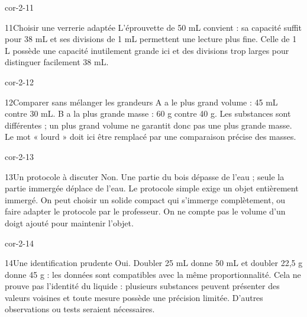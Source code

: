 \documentclass[12pt,twoside,openany]{book}
\begin{document}
\begin{blocLivre}{cor-2-11}
\begin{corrige}{11}{Choisir une verrerie adaptée}
L’éprouvette de 50 mL convient : sa capacité suffit pour 38 mL et ses divisions de 1 mL permettent une lecture plus fine. Celle de 1 L possède une capacité inutilement grande ici et des divisions trop larges pour distinguer facilement 38 mL.\par
\end{corrige}\end{blocLivre}
\clearpage
\begin{blocLivre}{cor-2-12}
\begin{corrige}{12}{Comparer sans mélanger les grandeurs}
A a le plus grand volume : 45 mL contre 30 mL. B a la plus grande masse : 60 g contre 40 g. Les substances sont différentes ; un plus grand volume ne garantit donc pas une plus grande masse. Le mot « lourd » doit ici être remplacé par une comparaison précise des masses.\par
\end{corrige}\end{blocLivre}
\begin{blocLivre}{cor-2-13}
\begin{corrige}{13}{Un protocole à discuter}
Non. Une partie du bois dépasse de l’eau ; seule la partie immergée déplace de l’eau. Le protocole simple exige un objet entièrement immergé. On peut choisir un solide compact qui s’immerge complètement, ou faire adapter le protocole par le professeur. On ne compte pas le volume d’un doigt ajouté pour maintenir l’objet.\par
{}
\end{corrige}\end{blocLivre}
\begin{blocLivre}{cor-2-14}
\begin{corrige}{14}{Une identification prudente}
Oui. Doubler 25 mL donne 50 mL et doubler 22,5 g donne 45 g : les données sont compatibles avec la même proportionnalité. Cela ne prouve pas l’identité du liquide : plusieurs substances peuvent présenter des valeurs voisines et toute mesure possède une précision limitée. D’autres observations ou tests seraient nécessaires.\par
\end{corrige}\end{blocLivre}
\end{document}
